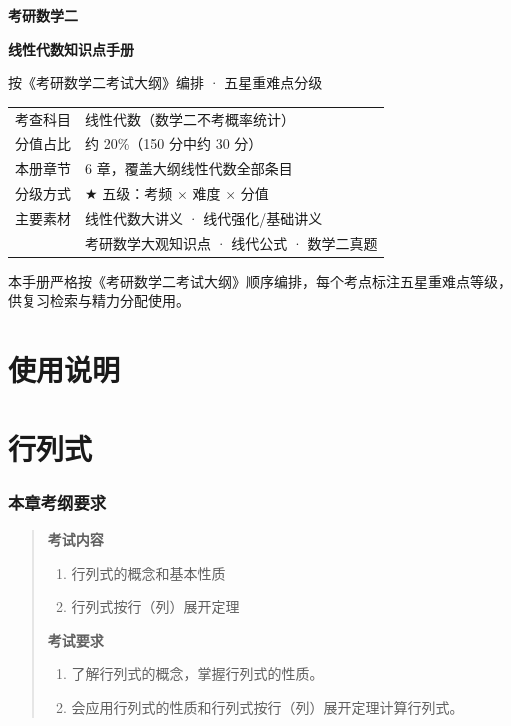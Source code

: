 \documentclass[11pt,openany,UTF8]{ctexbook}
\begin{document}
\begin{titlepage}
\centering
\vspace*{2.6cm}
{\Huge\bfseries 考研数学二\par}
\vspace{0.5cm}
{\Huge\bfseries 线性代数知识点手册\par}
\vspace{0.9cm}
{\Large 按《考研数学二考试大纲》编排 · 五星重难点分级\par}
\vspace{1.8cm}
{\normalsize
\begin{tabular}{rl}
考查科目 & 线性代数（数学二不考概率统计） \\
分值占比 & 约 20\%（150 分中约 30 分） \\
本册章节 & 6 章，覆盖大纲线性代数全部条目 \\
分级方式 & $\bigstar$ 五级：考频 $\times$ 难度 $\times$ 分值 \\
主要素材 & 线性代数大讲义 · 线代强化/基础讲义 \\
 & 考研数学大观知识点 · 线代公式 · 数学二真题
\end{tabular}\par}
\vfill
{\small 本手册严格按《考研数学二考试大纲》顺序编排，每个考点标注五星重难点等级，供复习检索与精力分配使用。\par}
\vspace{1.0cm}
\end{titlepage}


\frontmatter
\pagestyle{fancy}
\chapter*{使用说明}

\cleardoublepage
\tableofcontents
\mainmatter

\chapter{行列式}
\subsection*{本章考纲要求}

\begin{quote}
\textbf{考试内容}

\begin{enumerate}
\item 行列式的概念和基本性质
\item 行列式按行（列）展开定理
\end{enumerate}
\textbf{考试要求}

\begin{enumerate}
\item 了解行列式的概念，掌握行列式的性质。
\item 会应用行列式的性质和行列式按行（列）展开定理计算行列式。
\end{enumerate}
\end{quote}
\end{document}
